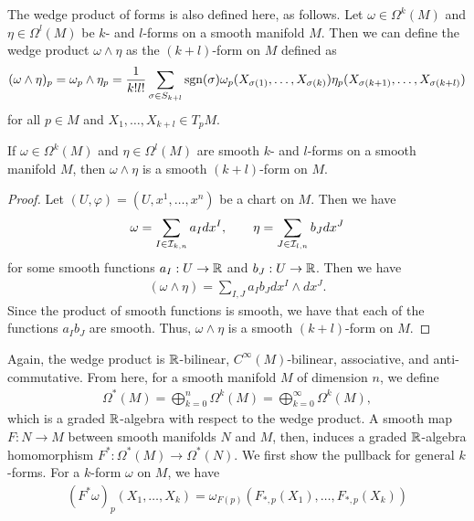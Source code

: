 The wedge product of forms is also defined here, as follows. Let $\omega \in \Omega^{k}(M)$ and $\eta \in \Omega^{l}(M)$ be $k$- and $l$-forms on a smooth manifold $M$. Then we can define the wedge product $\omega \wedge \eta$ as the $(k+l)$-form on $M$ defined as
\begin{align}
    (\omega \wedge \eta)_{p} = \omega_{p} \wedge \eta_{p} = \frac{1}{k!l!} \sum_{\sigma \in S_{k+l}} \operatorname{sgn}(\sigma) \omega_{p}(X_{\sigma(1)},\ldots,X_{\sigma(k)}) \eta_{p}(X_{\sigma(k+1)},\ldots,X_{\sigma(k+l)})
\end{align}
for all $p \in M$ and $X_{1},\ldots,X_{k+l} \in T_{p}M$.
\begin{proposition}
    If $\omega \in \Omega^{k}(M)$ and $\eta \in \Omega^{l}(M)$ are smooth $k$- and $l$-forms on a smooth manifold $M$, then $\omega \wedge \eta$ is a smooth $(k+l)$-form on $M$.
\end{proposition}
\begin{proof}
    Let $(U,\varphi) = (U,x^{1},\ldots,x^{n})$ be a chart on $M$. Then we have
    \begin{align}
        \omega = \sum_{I \in \mathcal{I}_{k,n}} a_{I} dx^{I}, \qquad \eta = \sum_{J \in \mathcal{I}_{l,n}} b_{J} dx^{J}
    \end{align}
    for some smooth functions $a_{I}:U \to \mathbb{R}$ and $b_{J}:U \to \mathbb{R}$. Then we have
    \begin{align}
        (\omega \wedge \eta) = \sum_{I,J} a_{I}b_{J} dx^{I} \wedge dx^{J}.
    \end{align}
    Since the product of smooth functions is smooth, we have that each of the functions $a_{I}b_{J}$ are smooth. Thus, $\omega \wedge \eta$ is a smooth $(k+l)$-form on $M$.
\end{proof}
Again, the wedge product is $\mathbb{R}$-bilinear, $C^{\infty}(M)$-bilinear, associative, and anti-commutative. From here, for a smooth manifold $M$ of dimension $n$, we define
\begin{align}
    \Omega^{\ast}(M) = \bigoplus_{k=0}^{n} \Omega^{k}(M) = \bigoplus_{k=0}^{\infty} \Omega^{k}(M),
\end{align}
which is a graded $\mathbb{R}$-algebra with respect to the wedge product. A smooth map $F:N \to M$ between smooth manifolds $N$ and $M$, then, induces a graded $\mathbb{R}$-algebra homomorphism $F^{\ast}:\Omega^{\ast}(M) \to \Omega^{\ast}(N)$. We first show the pullback for general $k$-forms. For a $k$-form $\omega$ on $M$, we have
\begin{align}
    (F^{\ast}\omega)_{p}(X_{1},\ldots,X_{k}) = \omega_{F(p)}(F_{\ast,p}(X_{1}),\ldots,F_{\ast,p}(X_{k}))
\end{align}
